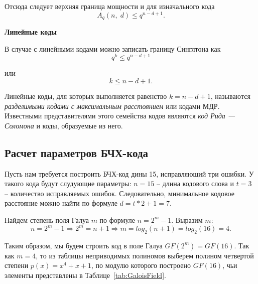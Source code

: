 Отсюда следует верхняя граница мощности и для изначального кода
$$A_q(n,\;d)\leqslant q^{n-d+1}.$$

\textbf{Линейные коды}

В случае с линейными кодами можно записать границу Синглтона как
$$q^k\leqslant q^{n-d+1}$$

или
$$k\leqslant n-d+1.$$

Линейные коды, для которых выполняется равенство $k=n-d+1$, называются \textit{разделимыми
кодами с максимальным расстоянием} или кодами МДР. Известными представителями этого семейства
кодов являются \textit{код Рида — Соломона} и коды, образуемые из него.

\subsection{Расчет параметров БЧХ-кода}
Пусть нам требуется построить БЧХ-код дины 15, исправляющий три ошибки. У такого кода будут
слудующие параметры: $n=15$ -- длина кодового слова и $t=3$ -- количество исправляемых ошибок.
Следовательно, минимальное кодовое расстояние можно найти по формуле $d=t*2+1=7$.

Найдем степень поля Галуа $m$ по формуле $n=2^m-1$. Выразим $m$:
$$n=2^m-1 \Rightarrow 2^m=n+1 \Rightarrow m=log_2(n+1)=log_2(16)=4.$$

Таким образом, мы будем строить код в поле Галуа $GF(2^m)=GF(16)$. Так как $m=4$, то из
таблицы неприводимых полиномов выберем полином четвертой степени $p(x)=x^4+x+1$, по модулю
которого построено $GF(16)$, чьи элементы представлены в Таблице~\ref{tab:GaloisField}.


